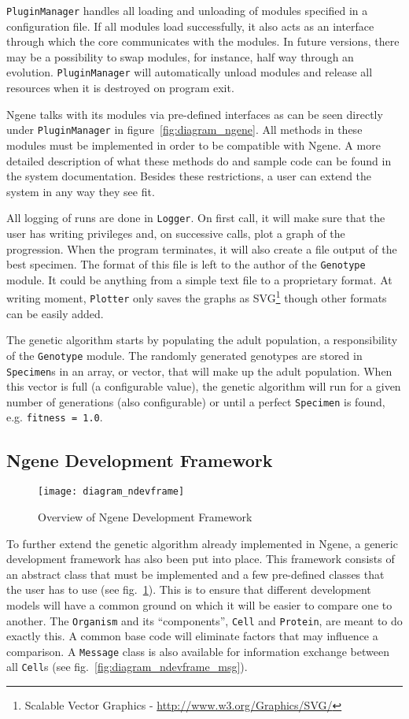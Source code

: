 \texttt{PluginManager} handles all loading and unloading of modules specified in a configuration file. If all modules load successfully, it also acts as an interface through which the core communicates with the modules. In future versions, there may be a possibility to swap modules, for instance, half way through an evolution. \texttt{PluginManager} will automatically unload modules and release all resources when it is destroyed on program exit.

Ngene talks with its modules via pre-defined interfaces as can be seen directly under \texttt{PluginManager} in figure~\ref{fig:diagram_ngene}. All methods in these modules must be implemented in order to be compatible with Ngene. A more detailed description of what these methods do and sample code can be found in the system documentation. Besides these restrictions, a user can extend the system in any way they see fit.

All logging of runs are done in \texttt{Logger}. On first call, it will make sure that the user has writing privileges and, on successive calls, plot a graph of the progression. When the program terminates, it will also create a file output of the best specimen. The format of this file is left to the author of the \texttt{Genotype} module. It could be anything from a simple text file to a proprietary format. At writing moment, \texttt{Plotter} only saves the graphs as SVG\footnote{Scalable Vector Graphics - \url{http://www.w3.org/Graphics/SVG/}} though other formats can be easily added.

The genetic algorithm starts by populating the adult population, a responsibility of the \texttt{Genotype} module. The randomly generated genotypes are stored in \texttt{Specimen}s in an array, or vector, that will make up the adult population. When this vector is full (a configurable value), the genetic algorithm will run for a given number of generations (also configurable) or until a perfect \texttt{Specimen} is found, e.g. \texttt{fitness = 1.0}.


\subsection{Ngene Development Framework}
\begin{figure}[ht]
	\centering
	\texttt{[image: diagram\_ndevframe]}
	\caption{Overview of Ngene Development Framework}
	\label{fig:diagram_ndevframe}
\end{figure}

To further extend the genetic algorithm already implemented in Ngene, a generic development framework has also been put into place. This framework consists of an abstract class that must be implemented and a few pre-defined classes that the user has to use (see fig.~\ref{fig:diagram_ndevframe}). This is to ensure that different development models will have a common ground on which it will be easier to compare one to another. The \texttt{Organism} and its ``components'', \texttt{Cell} and \texttt{Protein}, are meant to do exactly this. A common base code will eliminate factors that may influence a comparison. A \texttt{Message} class is also available for information exchange between all \texttt{Cell}s (see fig.~\ref{fig:diagram_ndevframe_msg}).

